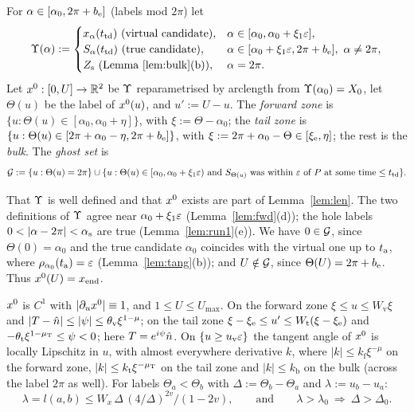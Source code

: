 \begin{definition}\label{def:x0}
For $\alpha\in[\alpha_0,2\pi+b_{\mathrm e}]$ (labels mod $2\pi$) let
\[
\Ups(\alpha):=\begin{cases}
x_\alpha(\ttd)\ \text{(virtual candidate)},&\alpha\in[\alpha_0,\alpha_0+\xi_1\eps],\\
S_\alpha(\ttd)\ \text{(true candidate)},&\alpha\in[\alpha_0+\xi_1\eps,2\pi+\be],\ \alpha\ne2\pi,\\
Z_{\mathrm s}\ \text{(Lemma~\ref{lem:bulk}(b))},&\alpha=2\pi .
\end{cases}
\]
Let $x^0:[0,U]\to\mathbb{R}^2$ be $\Upsilon$ reparametrised by arclength from $\Upsilon(\alpha_0)=X_0$, let $\Theta(u)$ be the label of $x^0(u)$, and
$u':=U-u$. The \emph{forward zone} is $\{u:\Theta(u)\in[\alpha_0,\alpha_0+\eta]\}$, with $\xi:=\Theta-\alpha_0$; the \emph{tail zone} is
$\{u:\Theta(u)\in[2\pi+\alpha_0-\eta,2\pi+b_{\mathrm e}]\}$, with $\xi:=2\pi+\alpha_0-\Theta\in[\xi_{\mathrm e},\eta]$; the rest is the \emph{bulk}. The
\emph{ghost set} is
\[
\mathcal G:=\{u:\Theta(u)=2\pi\}\cup\{u:\Theta(u)\in[\alpha_0,\alpha_0+\xi_1\varepsilon)\text{ and }S_{\Theta(u)}\text{ was within $\varepsilon$ of $P$ at
some time}\le t_{\mathrm{td}}\}.
\]
\end{definition}

That $\Upsilon$ is well defined and that $x^0$ exists are part of Lemma~\ref{lem:len}. The two definitions of $\Upsilon$ agree near
$\alpha_0+\xi_1\varepsilon$ (Lemma~\ref{lem:fwd}(d)); the hole labels $0<|\alpha-2\pi|<\as$ are true (Lemma~\ref{lem:run1}(e)). We have
$0\in\mathcal G$, since $\Theta(0)=\alpha_0$ and the true candidate $\alpha_0$ coincides with the virtual one up to $t_{\mathrm a}$, where
$\rho_{\alpha_0}(t_{\mathrm a})=\varepsilon$ (Lemma~\ref{lem:tang}(b)); and $U\notin\mathcal G$, since $\Theta(U)=2\pi+b_{\mathrm e}$. Thus $x^0(U)=x_{\mathrm{end}}$.

\begin{lemma}\label{lem:len}
$x^0$ is $C^1$ with $|\partial_ux^0|\equiv1$, and $1\le U\le U_{\max}$. On the forward zone $\xi\le u\le W_{\mathrm v}\xi$ and
$|T-\hat n|\le|\psi|\le\theta_{\mathrm v}\xi^{1-\mu}$; on the tail zone $\xi-\xi_{\mathrm e}\le u'\le W_{\mathrm t}(\xi-\xi_{\mathrm e})$ and
$-\theta_{\mathrm t}\xi^{1-\mu_{\mathrm T}}\le\psi<0$; here $T=e^{i\psi}\hat n$. On $\{u\ge u_{\mathrm v}\varepsilon\}$ the tangent angle of $x^0$ is locally
Lipschitz in $u$, with almost everywhere derivative $k$, where $|k|\le k_{\mathrm f}\xi^{-\mu}$ on the forward zone,
$|k|\le k_{\mathrm t}\xi^{-\mu_{\mathrm T}}$ on the tail zone and $|k|\le k_{\mathrm b}$ on the bulk (across the label $2\pi$ as well). For labels
$\Theta_a<\Theta_b$ with $\Delta:=\Theta_b-\Theta_a$ and $\lambda:=u_b-u_a$:
\[
\lambda=l(a,b)\le W_x\,\Delta\,(4/\Delta)^{2v}/(1-2v),\qquad\text{and}\qquad\lambda>\lambda_0\ \Longrightarrow\ \Delta>\Delta_0 .
\]
\end{lemma}

